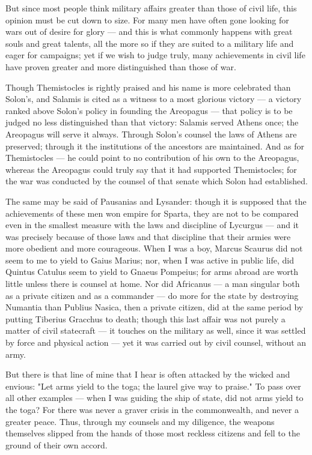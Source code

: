  But since most people think military affairs greater than those of civil life, this opinion must be cut down to size. For many men have often gone looking for wars out of desire for glory — and this is what commonly happens with great souls and great talents, all the more so if they are suited to a military life and eager for campaigns; yet if we wish to judge truly, many achievements in civil life have proven greater and more distinguished than those of war.

 Though Themistocles is rightly praised and his name is more celebrated than Solon's, and Salamis is cited as a witness to a most glorious victory — a victory ranked above Solon's policy in founding the Areopagus — that policy is to be judged no less distinguished than that victory: Salamis served Athens once; the Areopagus will serve it always. Through Solon's counsel the laws of Athens are preserved; through it the institutions of the ancestors are maintained. And as for Themistocles — he could point to no contribution of his own to the Areopagus, whereas the Areopagus could truly say that it had supported Themistocles; for the war was conducted by the counsel of that senate which Solon had established.

 The same may be said of Pausanias and Lysander: though it is supposed that the achievements of these men won empire for Sparta, they are not to be compared even in the smallest measure with the laws and discipline of Lycurgus — and it was precisely because of those laws and that discipline that their armies were more obedient and more courageous. When I was a boy, Marcus Scaurus did not seem to me to yield to Gaius Marius; nor, when I was active in public life, did Quintus Catulus seem to yield to Gnaeus Pompeius; for arms abroad are worth little unless there is counsel at home. Nor did Africanus — a man singular both as a private citizen and as a commander — do more for the state by destroying Numantia than Publius Nasica, then a private citizen, did at the same period by putting Tiberius Gracchus to death; though this last affair was not purely a matter of civil statecraft — it touches on the military as well, since it was settled by force and physical action — yet it was carried out by civil counsel, without an army.

 But there is that line of mine that I hear is often attacked by the wicked and envious: "Let arms yield to the toga; the laurel give way to praise." To pass over all other examples — when I was guiding the ship of state, did not arms yield to the toga? For there was never a graver crisis in the commonwealth, and never a greater peace. Thus, through my counsels and my diligence, the weapons themselves slipped from the hands of those most reckless citizens and fell to the ground of their own accord.

